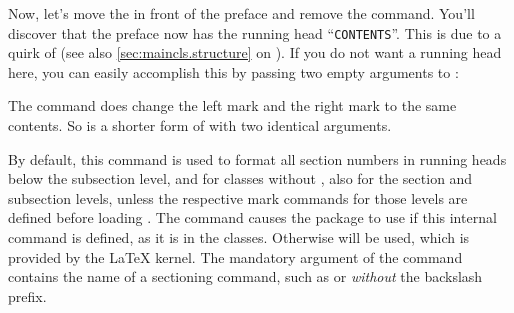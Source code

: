 \begin{Example}
      Now, let's move the  in front
      of the preface and remove the  command. You'll
      discover that the preface now has the running head
      ``\texttt{CONTENTS}''. This is due to a quirk of
       (see also \autoref{sec:maincls.structure}
      on ). If you do not want a running
      head here, you can easily accomplish this by passing two empty arguments 
      to :
    \end{Example}
  \fi%
  The command
   does change the left mark
  and the right mark to the same contents. So
   is a shorter form of
   with two identical
  arguments.%
  \EndIndexGroup
\fi


  \begin{Declaration}
  \end{Declaration}
  By default, this command is used to format all section numbers in running 
  heads below the subsection level, and for classes without
  , also for the section and subsection levels,
  unless the respective mark commands for those levels are defined before
  loading . The command causes the package to use
   if this internal command is defined,
  as it is in the \KOMAScript{} classes. Otherwise %
   will be used,
  which is provided by the \LaTeX{} kernel. The mandatory argument of the
  command contains the name of a sectioning command, such as 
  or  \emph{without} the backslash prefix.

